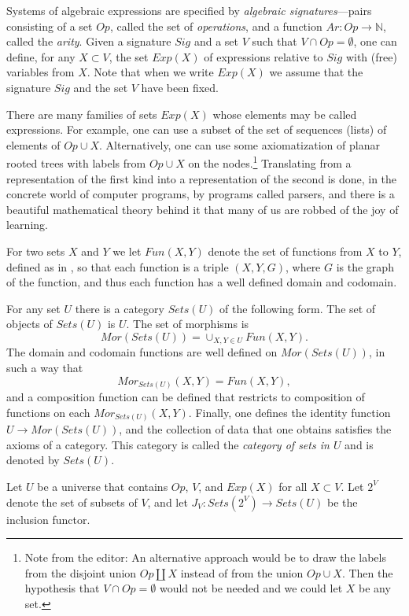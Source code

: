 \documentclass[onecolumn,12pt]{amsart}
\numberwithin{proposition}{subsection}
\newcommand{\sr}{\rightarrow}
\newcommand{\nn}{{\mathbb N}}
\newcommand{\nat}{\nn}
\newcommand{\editorfootnote}[1]{\footnote{Note from the editor: #1}}
\begin{document}
Systems of algebraic expressions are specified by {\em algebraic signatures}---pairs
consisting of a set $Op$, called the set of {\em operations}, and a function
$Ar:Op\sr \nat$, called the {\em arity}.  Given a signature $Sig$ and a set $V$ such that
$V\cap Op=\emptyset$, one can define, for any $X\subset V$, the set $Exp(X)$ of
expressions relative to $Sig$ with (free) variables from $X$. Note that when we
write $Exp(X)$ we assume that the signature $Sig$ and the set $V$ have been
fixed.

There are many families of sets $Exp(X)$ whose elements may be called
expressions. For example, one can use a subset of the set of sequences (lists)
of elements of $Op\cup X$. Alternatively, one can use some axiomatization of
planar rooted trees with labels from $Op\cup X$ on the nodes.\editorfootnote{
  An alternative approach would be to draw the labels from the disjoint union
  $Op \amalg X$ instead of from the union $Op\cup X$.  Then the hypothesis that
  $V\cap Op=\emptyset$ would not be needed and we could let $X$ be any set.}
Translating from a representation of the first kind into a representation of
the second is done, in the concrete world of computer programs, by programs
called parsers, and there is a beautiful mathematical theory behind it that
many of us are robbed of the joy of learning.

For two sets $X$ and $Y$ we let $Fun(X,Y)$ denote the set of functions from $X$
to $Y$, defined as in \cite[p.~81]{Bourbaki.Sets}, so that each function is a
triple $(X,Y,G)$, where $G$ is the graph of the function, and thus each
function has a well defined domain and codomain.

For any set $U$ there is a category $Sets(U)$ of the following form. The set of
objects of $Sets(U)$ is $U$. The set of morphisms is
%
$$Mor(Sets(U))=\cup_{X,Y\in U}Fun(X,Y).$$
%
The domain and codomain functions are well
defined on $Mor(Sets(U))$, in such a way that
%
$$Mor_{Sets(U)}(X,Y)=Fun(X,Y),$$
%
and a composition function can be defined that restricts to composition of
functions on each $Mor_{Sets(U)}(X,Y)$. Finally, one defines the identity function
$U\sr Mor(Sets(U))$, and the collection of data that one obtains
satisfies the axioms of a category.  This category is called the {\em category of
sets in $U$} and is denoted by $Sets(U)$.

Let $U$ be a universe that contains $Op$, $V$, and $Exp(X)$ for all $X\subset V$.
Let $2^V$ denote the set of subsets of $V$, and let
$J_V:Sets(2^V)\sr Sets(U)$ be the inclusion functor.
\end{document}

